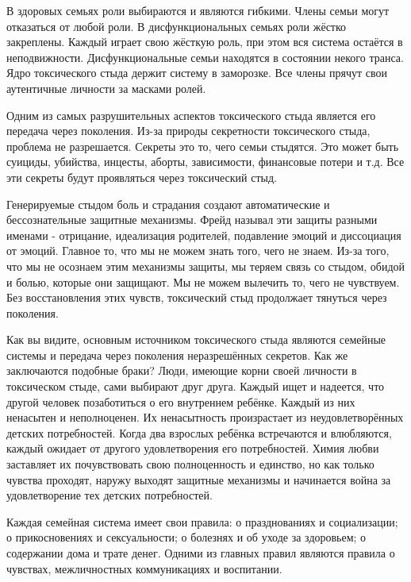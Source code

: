 \documentclass[10pt, fleqn]{article}
\begin{document}
В здоровых семьях роли выбираются и являются гибкими. Члены семьи могут отказаться от любой роли. В дисфункциональных семьях роли жёстко закреплены. Каждый играет свою жёсткую роль, при этом вся система остаётся в неподвижности. Дисфункциональные семьи находятся в состоянии некого транса. Ядро токсического стыда держит систему в заморозке. Все члены прячут свои аутентичные личности за масками ролей.


Одним из самых разрушительных аспектов токсического стыда является его передача через поколения. Из-за природы секретности токсического стыда, проблема не разрешается. Секреты это то, чего семьи стыдятся. Это может быть суициды, убийства, инцесты, аборты, зависимости, финансовые потери и т.д. Все эти секреты будут проявляться через токсический стыд.

Генерируемые стыдом боль и страдания создают автоматические и бессознательные защитные механизмы. Фрейд называл эти защиты разными именами - отрицание, идеализация родителей, подавление эмоций и диссоциация от эмоций. Главное то, что мы не можем знать того, чего не знаем. Из-за того, что мы не осознаем этим механизмы защиты, мы теряем связь со стыдом, обидой и болью, которые они защищают. Мы не можем вылечить то, чего не чувствуем. Без восстановления этих чувств, токсический стыд продолжает тянуться через поколения.


Как вы видите, основным источником токсического стыда являются семейные системы и передача через поколения неразрешённых секретов. Как же заключаются подобные браки? Люди, имеющие корни своей личности в токсическом стыде, сами выбирают друг друга. Каждый ищет и надеется, что другой человек позаботиться о его внутреннем ребёнке. Каждый из них ненасытен и неполноценен. Их ненасытность произрастает из неудовлетворённых детских потребностей. Когда два взрослых ребёнка встречаются и влюбляются, каждый ожидает от другого удовлетворения его потребностей. Химия любви заставляет их почувствовать свою полноценность и единство, но как только чувства проходят, наружу выходят защитные механизмы и начинается война за удовлетворение тех детских потребностей.


Каждая семейная система имеет свои правила: о празднованиях и социализации; о прикосновениях и сексуальности; о болезнях и об уходе за здоровьем; о содержании дома и трате денег. Одними из главных правил являются правила о чувствах, межличностных коммуникациях и воспитании.
\end{document}
